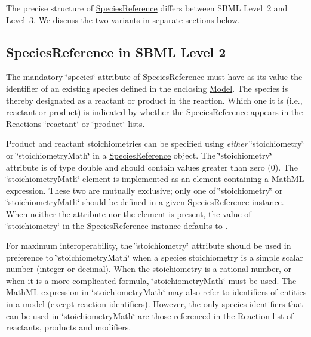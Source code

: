 The precise structure of \hyperlink{class_species_reference}{Species\+Reference} differs between S\+B\+ML Level~2 and Level~3. We discuss the two variants in separate sections below.\hypertarget{class_species_reference_spr-l2}{}\subsection{Species\+Reference in S\+B\+M\+L Level 2}\label{class_species_reference_spr-l2}
The mandatory \char`\"{}species\char`\"{} attribute of \hyperlink{class_species_reference}{Species\+Reference} must have as its value the identifier of an existing species defined in the enclosing \hyperlink{class_model}{Model}. The species is thereby designated as a reactant or product in the reaction. Which one it is (i.\+e., reactant or product) is indicated by whether the \hyperlink{class_species_reference}{Species\+Reference} appears in the \hyperlink{class_reaction}{Reaction}\textquotesingle{}s \char`\"{}reactant\char`\"{} or \char`\"{}product\char`\"{} lists.

Product and reactant stoichiometries can be specified using {\itshape either} \char`\"{}stoichiometry\char`\"{} or \char`\"{}stoichiometry\+Math\char`\"{} in a \hyperlink{class_species_reference}{Species\+Reference} object. The \char`\"{}stoichiometry\char`\"{} attribute is of type double and should contain values greater than zero (0). The \char`\"{}stoichiometry\+Math\char`\"{} element is implemented as an element containing a Math\+ML expression. These two are mutually exclusive; only one of \char`\"{}stoichiometry\char`\"{} or \char`\"{}stoichiometry\+Math\char`\"{} should be defined in a given \hyperlink{class_species_reference}{Species\+Reference} instance. When neither the attribute nor the element is present, the value of \char`\"{}stoichiometry\char`\"{} in the \hyperlink{class_species_reference}{Species\+Reference} instance defaults to {}.

For maximum interoperability, the \char`\"{}stoichiometry\char`\"{} attribute should be used in preference to \char`\"{}stoichiometry\+Math\char`\"{} when a species\textquotesingle{} stoichiometry is a simple scalar number (integer or decimal). When the stoichiometry is a rational number, or when it is a more complicated formula, \char`\"{}stoichiometry\+Math\char`\"{} must be used. The Math\+ML expression in \char`\"{}stoichiometry\+Math\char`\"{} may also refer to identifiers of entities in a model (except reaction identifiers). However, the only species identifiers that can be used in \char`\"{}stoichiometry\+Math\char`\"{} are those referenced in the \hyperlink{class_reaction}{Reaction} list of reactants, products and modifiers.

